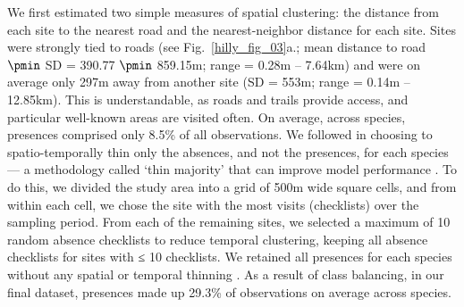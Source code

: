 We first estimated two simple measures of spatial clustering: the distance from each site to the nearest road \citep[road data from OpenStreetMap:][]{openstreetmapcontributors2017} and the nearest-neighbor distance for each site.
Sites were strongly tied to roads (see Fig.~\ref{hilly_fig_03}a.; mean distance to road $\pmin$ SD = 390.77 $\pmin$ 859.15m; range = 0.28m -- 7.64km) and were on average only 297m away from another site (SD = 553m; range = 0.14m -- 12.85km).
This is understandable, as roads and trails provide access, and particular well-known areas are visited often.
On average, across species, presences comprised only 8.5\% of all observations.
We followed \textcite{steen2021} in choosing to spatio-temporally thin only the absences, and not the presences, for each species --- a methodology called `thin majority' that can improve model performance \citep{steen2021}.
To do this, we divided the study area into a grid of 500m wide square cells, and from within each cell, we chose the site with the most visits (checklists) over the sampling period.
From each of the remaining sites, we selected a maximum of 10 random absence checklists to reduce temporal clustering, keeping all absence checklists for sites with ≤ 10 checklists.
We retained all presences for each species without any spatial or temporal thinning \citep{steen2021}.
As a result of class balancing, in our final dataset, presences made up 29.3\% of observations on average across species.

